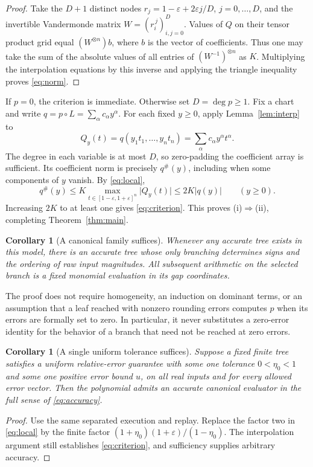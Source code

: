 \documentclass[11pt,a4paper]{article}
\newtheorem{corollary}[theorem]{Corollary}
\theoremstyle{definition}
\theoremstyle{remark}
\newcommand{\abs}[1]{\lvert #1\rvert}
\newcommand{\maj}[1]{#1^{\#}}
\begin{document}
\begin{proof}
Take the $D+1$ distinct nodes
$r_j=1-\varepsilon+2\varepsilon j/D$, $j=0,\ldots,D$, and the invertible
Vandermonde matrix $W=(r_i^{\,j})_{i,j=0}^{D}$. Values of $Q$ on their tensor
product grid equal $(W^{\otimes n})b$, where $b$ is the vector of coefficients.
Thus one may take the sum of the absolute values of all entries of
$(W^{-1})^{\otimes n}$ as $K$. Multiplying the interpolation equations by
this inverse and applying the triangle inequality proves \eqref{eq:norm}.
\end{proof}

If $p=0$, the criterion is immediate. Otherwise set $D=\deg p\ge1$. Fix a
chart and write $q=p\circ L=\sum_\alpha c_\alpha y^\alpha$. For each fixed
$y\ge0$, apply Lemma~\ref{lem:interp} to
\[
 Q_y(t)=q(y_1t_1,\ldots,y_nt_n)
       =\sum_\alpha c_\alpha y^\alpha t^\alpha.
\]
The degree in each variable is at most $D$, so zero-padding the coefficient
array is sufficient. Its coefficient norm is precisely $\maj q(y)$, including
when some components of $y$ vanish. By \eqref{eq:local},
\begin{equation}\label{eq:necessity}
 \maj q(y)
 \le K\max_{t\in[1-\varepsilon,1+\varepsilon]^n}\abs{Q_y(t)}
 \le2K\abs{q(y)}\qquad (y\ge0).
\end{equation}
Increasing $2K$ to at least one gives \eqref{eq:criterion}. This proves
(i)$\Rightarrow$(ii), completing Theorem~\ref{thm:main}.

\begin{corollary}[A canonical family suffices]
Whenever any accurate tree exists in this model, there is an accurate tree
whose only branching determines signs and the ordering of raw input
magnitudes. All subsequent arithmetic on the selected branch is a fixed
monomial evaluation in its gap coordinates.
\end{corollary}

The proof does not require homogeneity, an induction on dominant terms, or an
assumption that a leaf reached with nonzero rounding errors computes $p$ when
its errors are formally set to zero. In particular, it never substitutes a
zero-error identity for the behavior of a branch that need not be reached at
zero errors.


\begin{corollary}[A single uniform tolerance suffices]
Suppose a fixed finite tree satisfies a uniform relative-error guarantee with
some one tolerance $0<\eta_0<1$ and some one positive error bound $u$, on all
real inputs and for every allowed error vector. Then the polynomial admits an
accurate canonical evaluator in the full sense of \eqref{eq:accuracy}.
\end{corollary}
\begin{proof}
Use the same separated execution and replay. Replace the factor two in
\eqref{eq:local} by the finite factor
$(1+\eta_0)(1+\varepsilon)/(1-\eta_0)$. The interpolation argument still
establishes \eqref{eq:criterion}, and sufficiency supplies arbitrary accuracy.
\end{proof}
\end{document}
